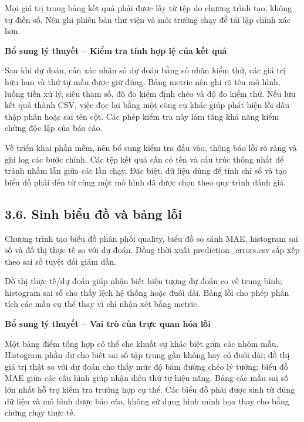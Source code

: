 \documentclass[12pt,a4paper,oneside]{article}
\begin{document}
Mọi giá trị trong bảng kết quả phải được lấy từ tệp do chương trình tạo,
không tự điền số. Nên ghi phiên bản thư viện và môi trường chạy để tái
lập chính xác hơn.


\par\noindent\textbf{Bổ sung lý thuyết -- Kiểm tra tính hợp lệ của kết quả}\par
Sau khi dự đoán, cần xác nhận số dự đoán bằng số nhãn kiểm thử, các giá trị hữu hạn và thứ tự mẫu được giữ đúng. Bảng metric nên ghi rõ tên mô hình, luồng tiền xử lý, siêu tham số, độ đo kiểm định chéo và độ đo kiểm thử. Nếu lưu kết quả thành CSV, việc đọc lại bằng một công cụ khác giúp phát hiện lỗi dấu thập phân hoặc sai tên cột. Các phép kiểm tra này làm tăng khả năng kiểm chứng độc lập của báo cáo.\par

Về triển khai phần mềm, nên bổ sung kiểm tra đầu vào, thông báo lỗi rõ ràng và ghi log các bước chính. Các tệp kết quả cần có tên và cấu trúc thống nhất để tránh nhầm lẫn giữa các lần chạy. Đặc biệt, dữ liệu dùng để tính chỉ số và tạo biểu đồ phải đến từ cùng một mô hình đã được chọn theo quy trình đánh giá.\par

\subsection*{3.6. Sinh biểu đồ và bảng lỗi}

Chương trình tạo biểu đồ phân phối quality, biểu đồ so sánh MAE,
histogram sai số và đồ thị thực tế so với dự đoán. Đồng thời xuất
prediction\_errors.csv sắp xếp theo sai số tuyệt đối giảm dần.

Đồ thị thực tế/dự đoán giúp nhận biết hiện tượng dự đoán co về trung
bình; histogram sai số cho thấy lệch hệ thống hoặc đuôi dài. Bảng lỗi
cho phép phân tích các mẫu cụ thể thay vì chỉ nhận xét bằng metric.


\par\noindent\textbf{Bổ sung lý thuyết -- Vai trò của trực quan hóa lỗi}\par
Một bảng điểm tổng hợp có thể che khuất sự khác biệt giữa các nhóm mẫu. Histogram phần dư cho biết sai số tập trung gần không hay có đuôi dài; đồ thị giá trị thật so với dự đoán cho thấy mức độ bám đường chéo lý tưởng; biểu đồ MAE giữa các cấu hình giúp nhận diện thứ tự hiệu năng. Bảng các mẫu sai số lớn nhất hỗ trợ kiểm tra trường hợp cụ thể. Các biểu đồ phải được sinh từ đúng dữ liệu và mô hình được báo cáo, không sử dụng hình minh họa thay cho bằng chứng chạy thực tế.\par
\end{document}
